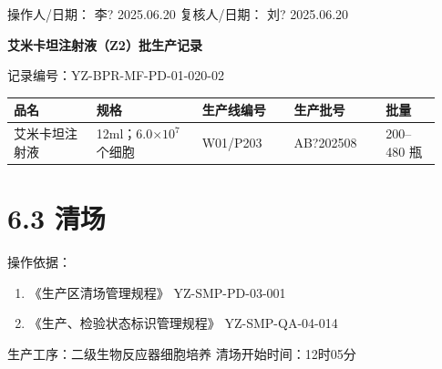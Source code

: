 \documentclass[UTF8,10pt,a4paper,fontset=fandol]{ctexart}
\newcommand{\fieldvalue}[1]{#1}
\newcommand{\handwritten}[1]{#1}
\begin{document}
\noindent
操作人/日期：%
\fieldvalue{\handwritten{李?}}
\quad
\fieldvalue{\handwritten{2025.06.20}}
\hfill
复核人/日期：%
\fieldvalue{\handwritten{刘?}}
\quad
\fieldvalue{\handwritten{2025.06.20}}

\newpage

\begin{center}
\textbf{艾米卡坦注射液（Z2）批生产记录}
\end{center}

记录编号：YZ-BPR-MF-PD-01-020-02

\begin{tabular}{|p{0.18\linewidth}|p{0.23\linewidth}|p{0.20\linewidth}|p{0.20\linewidth}|p{0.12\linewidth}|}
\hline
品名 & 规格 & 生产线编号 & 生产批号 & 批量 \\
\hline
\fieldvalue{艾米卡坦注射液}
&
\fieldvalue{12ml；6.0$\times10^{7}$个细胞}
&
\fieldvalue{\handwritten{W01/P203}}
&
\fieldvalue{\handwritten{AB?202508}}
&
\fieldvalue{200--480 瓶}
\\
\hline
\end{tabular}

\section*{6.3 清场}

操作依据：

\begin{enumerate}
\item 《生产区清场管理规程》 \hfill YZ-SMP-PD-03-001
\item 《生产、检验状态标识管理规程》 \hfill YZ-SMP-QA-04-014
\end{enumerate}

生产工序：二级生物反应器细胞培养 \hfill 清场开始时间：12时05分
\end{document}
